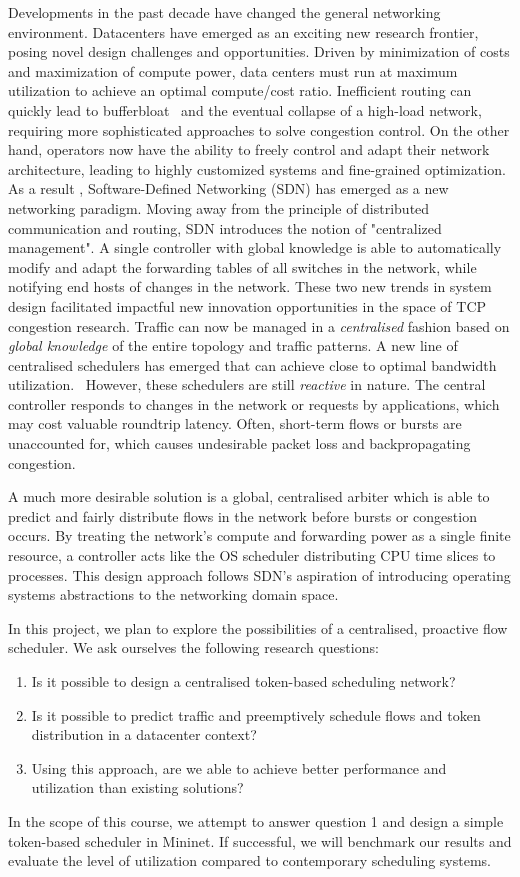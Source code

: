 Developments in the past decade have changed the general networking environment. Datacenters have emerged as an exciting new research frontier, posing novel  design challenges and opportunities.
Driven by minimization of costs and maximization of compute power, data centers must  run at maximum utilization to achieve an optimal compute/cost ratio. Inefficient routing can quickly lead to bufferbloat~\cite{bufferbloat} and the eventual collapse of a high-load network, requiring more sophisticated approaches to solve congestion control. 
On the other hand, operators now have the ability to freely control and adapt their network architecture, leading to highly customized systems and fine-grained optimization. As a result , Software-Defined Networking (SDN) has emerged as a new networking paradigm. Moving away from the principle of distributed communication and routing, SDN introduces the notion of "centralized management". A single controller with global knowledge is able to automatically modify and adapt the forwarding tables of all switches in the network, while notifying end hosts of changes in the network.
These two new trends in system design facilitated impactful new innovation opportunities in the space of TCP congestion research. Traffic can now be managed in a  \textit{centralised} fashion based on \textit{global knowledge} of the entire topology and traffic patterns.
A new line of centralised schedulers has emerged that  can achieve close to optimal bandwidth utilization.~\cite{hedera, fastpass, microte, b4, dionysus}
However, these schedulers are still  \textit{reactive}  in nature. The central controller responds to changes in the network or requests by applications, which may cost valuable roundtrip latency. Often, short-term flows or bursts are unaccounted for, which causes undesirable packet loss and backpropagating congestion. 

A much more desirable solution is a global, centralised arbiter which is able to predict and fairly distribute flows in the network before bursts or congestion occurs. By treating the network’s compute and forwarding power as a single finite resource, a controller acts like the OS scheduler distributing CPU time slices to processes. This design approach follows SDN’s aspiration of introducing operating systems abstractions to the networking domain space.


In this project, we plan to explore the possibilities of a centralised, proactive flow scheduler. We ask ourselves the following research questions:
\begin{enumerate}
\item Is it possible to design a centralised token-based scheduling network?
\item Is it possible to predict traffic and preemptively schedule flows and token distribution in a datacenter context?
\item Using this approach, are we able to achieve better performance and utilization than existing solutions?
\end{enumerate}

In the scope of this course, we attempt to answer question 1 and design a simple token-based scheduler in Mininet. If successful, we will benchmark our results and evaluate the level of utilization compared to contemporary scheduling systems.


